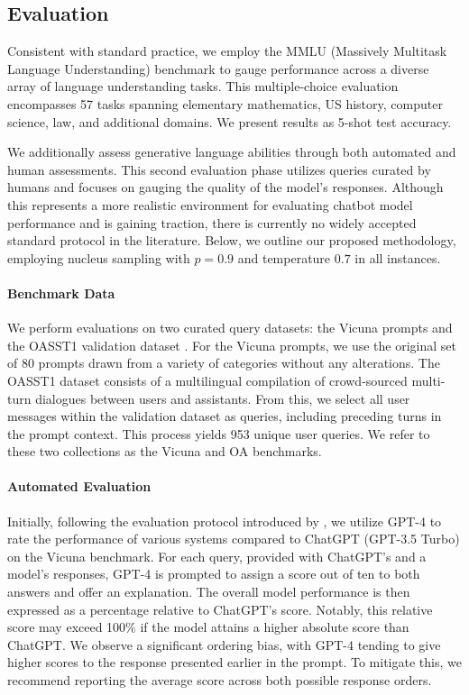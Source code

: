 \subsection{Evaluation}

Consistent with standard practice, we employ the MMLU (Massively Multitask Language Understanding) benchmark \citep{hendrycksmeasuring} to gauge performance across a diverse array of language understanding tasks. This multiple-choice evaluation encompasses 57 tasks spanning elementary mathematics, US history, computer science, law, and additional domains. We present results as 5-shot test accuracy.

We additionally assess generative language abilities through both automated and human assessments. This second evaluation phase utilizes queries curated by humans and focuses on gauging the quality of the model's responses. Although this represents a more realistic environment for evaluating chatbot model performance and is gaining traction, there is currently no widely accepted standard protocol in the literature. Below, we outline our proposed methodology, employing nucleus sampling with $p=0.9$ and temperature $0.7$ in all instances.

\paragraph{Benchmark Data} We perform evaluations on two curated query datasets: the Vicuna prompts \citep{vicuna2023} and the OASST1 validation dataset \citep{kopf2023openassistant}. For the Vicuna prompts, we use the original set of 80 prompts drawn from a variety of categories without any alterations. The OASST1 dataset consists of a multilingual compilation of crowd-sourced multi-turn dialogues between users and assistants. From this, we select all user messages within the validation dataset as queries, including preceding turns in the prompt context. This process yields 953 unique user queries. We refer to these two collections as the Vicuna and OA benchmarks.

\paragraph{Automated Evaluation} Initially, following the evaluation protocol introduced by \citet{vicuna2023}, we utilize GPT-4 to rate the performance of various systems compared to ChatGPT (GPT-3.5 Turbo) on the Vicuna benchmark. For each query, provided with ChatGPT’s and a model’s responses, GPT-4 is prompted to assign a score out of ten to both answers and offer an explanation. The overall model performance is then expressed as a percentage relative to ChatGPT’s score. Notably, this relative score may exceed 100\% if the model attains a higher absolute score than ChatGPT. We observe a significant ordering bias, with GPT-4 tending to give higher scores to the response presented earlier in the prompt. To mitigate this, we recommend reporting the average score across both possible response orders.

